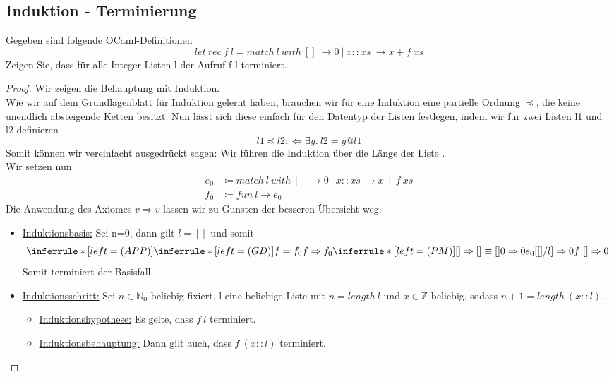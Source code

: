 \documentclass[hidelinks]{article}
\theoremstyle{plain}
\theoremstyle{definition}
\theoremstyle{rem}
\begin{document}
\begin{sloppypar}
\subsection{Induktion - Terminierung}
Gegeben sind folgende OCaml-Definitionen
\begin{equation*}
	let\ rec\ f\ l = match\ l\ with\ []\ \rightarrow 0\ |\ x::xs\ \rightarrow x+f\ xs
\end{equation*}
Zeigen Sie, dass für alle Integer-Listen l der Aufruf f l terminiert.
\begin{proof}
Wir zeigen die Behauptung mit Induktion.\\
Wie wir auf dem Grundlagenblatt für Induktion gelernt haben, brauchen wir für eine Induktion eine partielle Ordnung $\preceq$, die keine unendlich absteigende Ketten besitzt. Nun lässt sich diese einfach für den Datentyp der Listen festlegen, indem wir für zwei Listen l1 und l2 definieren
\begin{equation*}
	l1\preceq l2:\iff \exists y.\ l2=y@l1
\end{equation*}
Somit können wir vereinfacht ausgedrückt sagen: Wir führen die Induktion über die Länge der Liste .\\
Wir setzen nun
\begin{align*}
	e_0&\coloneqq match\ l\ with\ []\ \rightarrow 0\ |\ x::xs\ \rightarrow x+f\ xs\\
	f_0&\coloneqq fun\ l\rightarrow e_0
\end{align*}
Die Anwendung des Axiomes $v\Rightarrow v$ lassen wir zu Gunsten der besseren Übersicht weg.
\begin{itemize}
\item \underline{Induktionsbasis:} Sei n=0, dann gilt $l=[]$ und somit
\[
\inferrule*[left=(APP)]{
	\inferrule*[left=(GD)]
	{
		{f=f_0}
	}
	{f\Rightarrow f_0}
	\inferrule*[left=(PM)]
	{
		{[]\Rightarrow[]\equiv[]}\\
		{0\Rightarrow 0}
	}
	{e_0[[]/l]\Rightarrow 0}
}
{f\ []\Rightarrow 0}
\]
Somit terminiert der Basisfall.
\item \underline{Induktionsschritt:} Sei $n\in \mathbb{N}_0$ beliebig fixiert, l eine beliebige Liste mit $n=length\ l$ und $x\in\mathbb{Z}$ beliebig, sodass $n+1=length\ (x::l)$.
	\begin{itemize}
	\item \underline{Induktionshypothese:} Es gelte, dass $f\ l$ terminiert.
	\item \underline{Induktionsbehauptung:} Dann gilt auch, dass $f\ (x::l)$ terminiert.

\end{itemize}
\end{itemize}
\end{proof}
\end{sloppypar}
\end{document}
